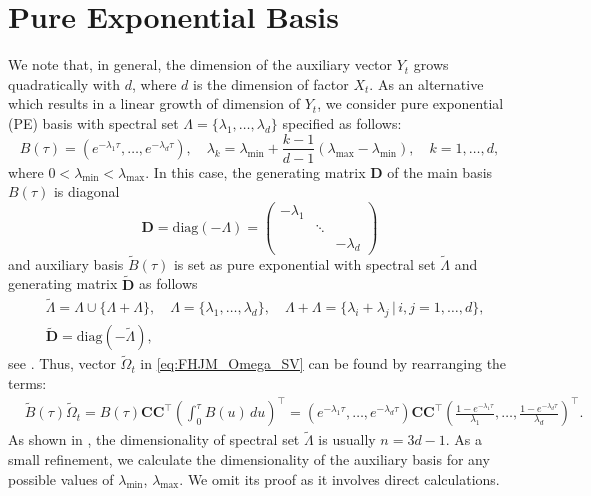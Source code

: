 \documentclass[pdftex,11pt,a4paper] {article}
\begin{document}
\section{Pure Exponential Basis}\label{sec:expon_basis}

We note that, in general, the dimension of the auxiliary vector $Y_{t}$ grows quadratically with  $d$, where $d$ is the dimension of factor $X_{t}$. As an alternative which results in a linear growth of dimension of $Y_{t}$, we consider pure exponential (PE) basis with spectral set $\Lambda=\{\lambda_1,\ldots, \lambda_d\}$ specified as follows:
\begin{equation}\label{eq:PE_basis}
B(\tau)=\left(e^{-\lambda_1\tau},\ldots, e^{-\lambda_d\tau}\right),\quad
\lambda_k=\lambda_{\min}+\frac{k-1}{d-1}\left(\lambda_{\max}-\lambda_{\min}\right),\quad k=1,\ldots, d,
\end{equation}
where $0<\lambda_{\min}<\lambda_{\max}$. In this case, the generating matrix $\mathbf{D}$ of the main basis $B(\tau)$ is diagonal
\begin{equation}\label{eq:PE_matrix_D_X}
\mathbf{D}=\text{diag}\left(-\Lambda\right)=
\begin{pmatrix}
    -\lambda_{1} & & \\
    & \ddots & \\
    & & -\lambda_{d}
  \end{pmatrix}	
\end{equation}
and auxiliary basis $\tilde B(\tau)$ is set as pure exponential with spectral set $\tilde\Lambda$ and generating matrix $\tilde{\mathbf{D}}$ as follows
\begin{equation}\label{eq:PE_matrix_D_Y}
\begin{split}
&\tilde\Lambda=\Lambda\cup \{\Lambda+\Lambda\},\quad \Lambda=\{\lambda_1,\ldots, \lambda_d\},
\quad \Lambda+\Lambda=\{\lambda_i+\lambda_j\,|\,i,j=1,\ldots, d\}, \\
&\mathbf{\tilde D}=\text{diag}\left(-\tilde\Lambda\right),
\end{split}
\end{equation}
see \cite{Lyashenko2023}. Thus, vector $\tilde\Omega_t$ in \eqref{eq:FHJM_Omega_SV} can be found by rearranging the terms:
\begin{equation}\label{eq:PE_Omega0}
\begin{split}
&\tilde B(\tau)\tilde \Omega_t=B(\tau)\mathbf{C}\mathbf{C}^\top \left(\int_0^\tau B(u)\,du\right)^\top=\left(e^{-\lambda_1\tau},\ldots, e^{-\lambda_d\tau}\right)\mathbf{C}\mathbf{C}^\top
\left(\frac{1-e^{-\lambda_1\tau}}{\lambda_1},\ldots, \frac{1-e^{-\lambda_d\tau}}{\lambda_d}\right)^\top.
\end{split}
\end{equation}
As shown in \cite{Lyashenko2023}, the dimensionality of spectral set $\tilde \Lambda$ is usually $n=3d-1$. As a small refinement, we calculate the dimensionality of the auxiliary basis for any possible values of $\lambda_{\min}$, $\lambda_{\max}$. We omit its proof as it involves direct calculations. 
\end{document}

